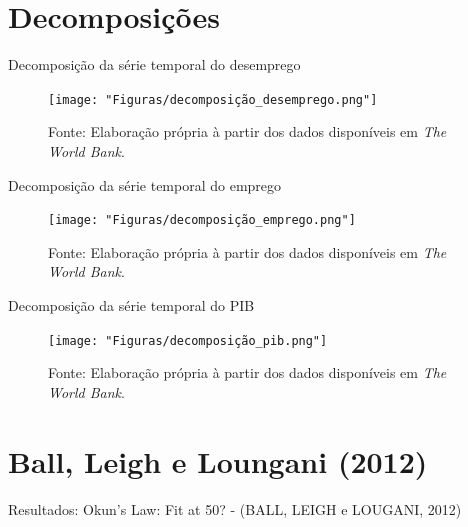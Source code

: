 \documentclass[11pt]{beamer}
\begin{document}
\section{Decomposições}

\begin{frame}{Decomposição da série temporal do desemprego}

\begin{figure}[H]
	\centering
	\label{fig:decomposição_desemprego}
	\texttt{[image: "Figuras/decomposição\_desemprego.png"]} \\
\caption*{Fonte: Elaboração própria à partir dos dados disponíveis em \textit{The World Bank}.}
\end{figure}

\end{frame}

\begin{frame}{Decomposição da série temporal do emprego}

\begin{figure}[H]
	\centering
	\label{fig:decomposição_emprego}
	\texttt{[image: "Figuras/decomposição\_emprego.png"]} \\
\caption*{Fonte: Elaboração própria à partir dos dados disponíveis em \textit{The World Bank}.}
\end{figure}

\end{frame}

\begin{frame}{Decomposição da série temporal do PIB}

\begin{figure}[H]
	\centering
	\label{fig:decomposição_pib}
	\texttt{[image: "Figuras/decomposição\_pib.png"]} \\
\caption*{Fonte: Elaboração própria à partir dos dados disponíveis em \textit{The World Bank}.}
\end{figure}

\end{frame}

\section{Ball, Leigh e Loungani (2012)}

\begin{frame}{}

\centering Resultados: Okun's Law: Fit at 50?  - (BALL, LEIGH e LOUGANI, 2012)

\end{frame}
\end{document}

